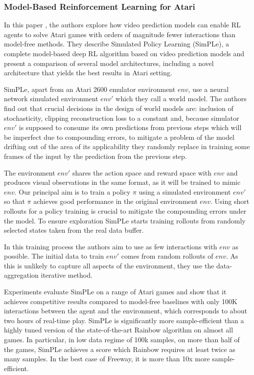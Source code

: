 \subsubsection{Model-Based Reinforcement Learning for Atari}

In this paper \cite{Algo.SimPLe}, the authors explore how video prediction models can enable RL agents to solve Atari games with orders of magnitude fewer interactions than model-free methods. They describe Simulated Policy Learning (SimPLe), a complete model-based deep RL algorithm based on video prediction models and present a comparison of several model architectures, including a novel architecture that yields the best results in Atari setting.

SimPLe, apart from an Atari 2600 emulator environment $env$, use a neural network simulated environment $env'$ which they call a world model. The authors find out that crucial decisions in the design of world models are: inclusion of stochasticity, clipping reconstruction loss to a constant and, because simulator $env'$ is supposed to consume its own predictions from previous steps which will be imperfect due to compounding errors, to mitigate a problem of the model drifting out of the area of its applicability they randomly replace in training some frames of the input by the prediction from the previous step. 

The environment $env'$ shares the action space and reward space with $env$ and produces visual observations in the same format, as it will be trained to mimic $env$. Our principal aim is to train a policy $\pi$ using a simulated environment $env'$ so that $\pi$ achieves good performance in the original environment $env$. Using short rollouts for a policy training is crucial to mitigate the compounding errors under the model. To ensure exploration SimPLe starts training rollouts from randomly selected states taken from the real data buffer.

In this training process the authors aim to use as few interactions with $env$ as possible. The initial data to train $env'$ comes from random rollouts of $env$. As this is unlikely to capture all aspects of the environment, they use the data-aggregation iterative method.

Experiments evaluate SimPLe on a range of Atari games and show that it achieves competitive results compared to model-free baselines with only 100K interactions between the agent and the environment, which corresponds to about two hours of real-time play. SimPLe is significantly more sample-efficient than a highly tuned version of the state-of-the-art Rainbow algorithm \cite{Algo.Rainbow} on almost all games. In particular, in low data regime of 100k samples, on more than half of the games, SimPLe achieves a score which Rainbow requires at least twice as many samples. In the best case of Freeway, it is more than 10x more sample-efficient.

